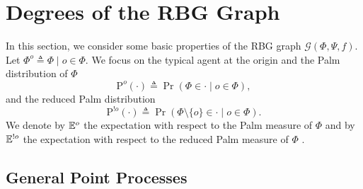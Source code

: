 
    \section{Degrees of the RBG Graph}
In this section, we consider some basic properties of the RBG graph $\mathcal{G}(\Phi,\Psi, f)$. Let $\Phi^o\triangleq \Phi\mid o\in\Phi.$ We focus on the typical agent at the origin and the Palm distribution of $\Phi$
\begin{equation}
 \mathrm{P}_{}^{o}(\cdot) \triangleq \Pr(\Phi\in\cdot \mid o\in\Phi),\nonumber
\end{equation}
and the reduced Palm distribution
\begin{equation}
 \mathrm{P}_{}^{!o}(\cdot) \triangleq \Pr(\Phi\setminus\{o\}\in\cdot\mid o\in\Phi).\nonumber
\end{equation}
We denote by $\mathbb{E}_{}^{{o}}$ the  expectation with respect to the Palm measure of $\Phi$
   and by $\mathbb{E}_{}^{!o}$ the  expectation with respect to the reduced Palm measure of $\Phi$ \cite[Chapter 8]{haenggi2012stochastic}.
    




\subsection{General Point Processes}

